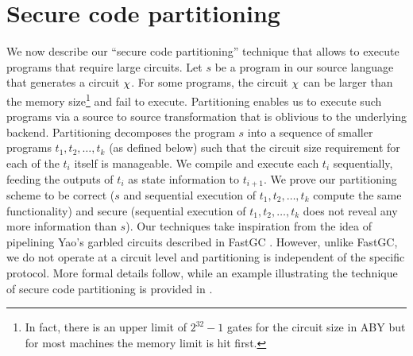 \section{Secure code partitioning}
\label{sec:pipe}

\newcommand{\prog}{s}
\newcommand{\progn}{t}
\newcommand{\mprog}{u}
\newcommand{\seq}{||}
\newcommand{\stateq}{q}

We  now describe our ``secure code partitioning'' technique that
allows \tool to execute programs that require large circuits.
Let $\prog$ be a program in our source language that
generates a circuit $\chi$. For some programs, the circuit $\chi$
can be larger than
the memory size\footnote{In fact, there is
  an upper limit of $2^{32}-1$ gates for the circuit size in ABY but
  for most machines the memory limit is hit first.} and fail to
execute. Partitioning enables us to 
execute such programs via a source to source transformation that is
oblivious to the underlying \mpc backend. Partitioning decomposes the
program $\prog$ into a sequence of smaller \tool programs
$\progn_1,\progn_2,\ldots,\progn_k$ (as defined below) such
that the circuit size
requirement for each of the $\progn_i$ itself is manageable. We compile
and execute each $\progn_i$ sequentially, feeding the outputs of
$\progn_i$ as state
information to $\progn_{i+1}$. We prove our partitioning scheme to be
correct ($\prog$ and sequential execution of $\progn_1,\progn_2,\ldots,\progn_k$ compute
the same functionality) and secure (sequential execution of
$\progn_1,\progn_2,\ldots,\progn_k$ does
not reveal any more information than $\prog$). 
Our techniques take inspiration from the idea of pipelining Yao's garbled circuits described in FastGC \cite{yao-pipe}.
However, unlike FastGC, we do not operate at a circuit level and partitioning is independent of the specific
\mpc protocol. 
%
%
More formal details follow, while an example illustrating the technique of secure code partitioning is provided in  . 

